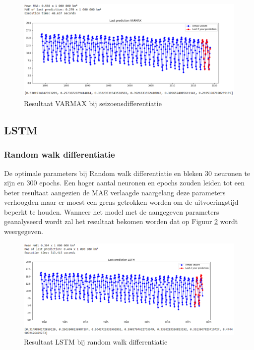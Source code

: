 \begin{figure}[!h]
    \centering
    \caption{Resultaat VARMAX bij seizoensdifferentiatie}
    \label{fig:mvsvarmaxsdiff}
    \includegraphics[width=1\linewidth]{mv_s_varmax_s_diff}
\end{figure}

\clearpage
\subsection{LSTM}
\subsubsection{Random walk differentiatie}
De optimale parameters bij Random walk differentiatie en bleken 30 neuronen te zijn en 300 epochs. Een hoger aantal neuronen en epochs zouden leiden tot een beter resultaat aangezien de MAE verlaagde naargelang deze parameters verhoogden maar er moest een grens getrokken worden om de uitvoeringstijd beperkt te houden. Wanneer het model met de aangegeven parameters geanalyseerd wordt zal het resultaat bekomen worden dat op Figuur \ref{fig:mvslstmdiff} wordt weergegeven.

\begin{figure}[!h]
    \centering
    \caption{Resultaat LSTM bij random walk differentiatie}
    \label{fig:mvslstmdiff}
    \includegraphics[width=1\linewidth]{mv_s_lstm_diff}
\end{figure}


